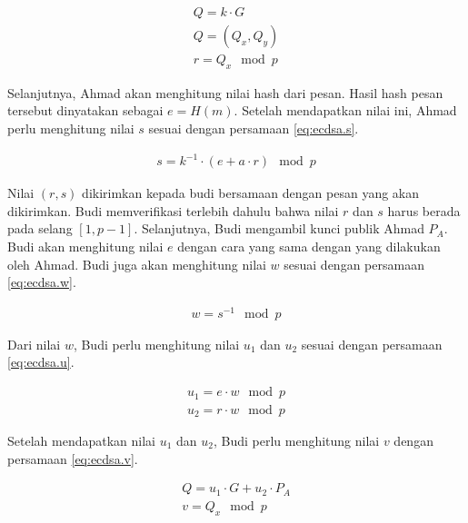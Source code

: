 \begin{equation}
  \label{eq:ecdsa.key}
  \begin{array}{l}   
    Q = k \cdot G \\
    Q = (Q_x, Q_y) \\
    r = Q_x \mod p
  \end{array}
\end{equation}

Selanjutnya, Ahmad akan menghitung nilai hash dari pesan. Hasil hash pesan tersebut dinyatakan sebagai $e = H(m)$. Setelah mendapatkan nilai ini, Ahmad perlu menghitung nilai $s$ sesuai dengan persamaan \ref{eq:ecdsa.s}.

\begin{equation}
  \label{eq:ecdsa.s}
  \begin{array}{l}   
    s = k^{-1} \cdot (e + a \cdot r) \mod p
  \end{array}
\end{equation}

Nilai $(r,s)$ dikirimkan kepada budi bersamaan dengan pesan yang akan dikirimkan. Budi memverifikasi terlebih dahulu bahwa nilai $r$ dan $s$ harus berada pada selang $[1, p-1]$. Selanjutnya, Budi mengambil kunci publik Ahmad $P_{A}$. Budi akan menghitung nilai $e$ dengan cara yang sama dengan yang dilakukan oleh Ahmad. Budi juga akan menghitung nilai $w$ sesuai dengan persamaan \ref{eq:ecdsa.w}.

\begin{equation}
  \label{eq:ecdsa.w}
  \begin{array}{l}   
    w = s^{-1} \mod p
  \end{array}
\end{equation}

Dari nilai $w$, Budi perlu menghitung nilai $u_1$ dan $u_2$ sesuai dengan persamaan \ref{eq:ecdsa.u}.

\begin{equation}
  \label{eq:ecdsa.u}
  \begin{array}{l}   
    u_1 = e \cdot w \mod p \\
    u_2 = r \cdot w \mod p
  \end{array}
\end{equation}

Setelah mendapatkan nilai $u_1$ dan $u_2$, Budi perlu menghitung nilai $v$ dengan persamaan \ref{eq:ecdsa.v}.

\begin{equation}
  \label{eq:ecdsa.v}
  \begin{array}{l}   
    Q = u_1 \cdot G + u_2 \cdot P_{A} \\
    v = Q_x \mod p
  \end{array}
\end{equation}

